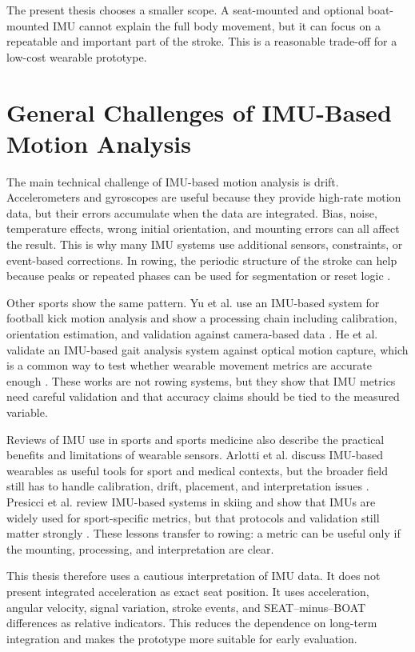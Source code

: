 The present thesis chooses a smaller scope. A seat-mounted and optional boat-mounted IMU cannot explain the full body movement, but it can focus on a repeatable and important part of the stroke. This is a reasonable trade-off for a low-cost wearable prototype.

\section{General Challenges of IMU-Based Motion Analysis}

The main technical challenge of IMU-based motion analysis is drift. Accelerometers and gyroscopes are useful because they provide high-rate motion data, but their errors accumulate when the data are integrated. Bias, noise, temperature effects, wrong initial orientation, and mounting errors can all affect the result. This is why many IMU systems use additional sensors, constraints, or event-based corrections. In rowing, the periodic structure of the stroke can help because peaks or repeated phases can be used for segmentation or reset logic \cite{cloud_adaptive_2019,rodriguez_mendoza_wearable_2024}.

Other sports show the same pattern. Yu et al. use an IMU-based system for football kick motion analysis and show a processing chain including calibration, orientation estimation, and validation against camera-based data \cite{yu_motion_2022}. He et al. validate an IMU-based gait analysis system against optical motion capture, which is a common way to test whether wearable movement metrics are accurate enough \cite{he_accuracy_2024}. These works are not rowing systems, but they show that IMU metrics need careful validation and that accuracy claims should be tied to the measured variable.

Reviews of IMU use in sports and sports medicine also describe the practical benefits and limitations of wearable sensors. Arlotti et al. discuss IMU-based wearables as useful tools for sport and medical contexts, but the broader field still has to handle calibration, drift, placement, and interpretation issues \cite{arlotti_benefits_2022}. Presicci et al. review IMU-based systems in skiing and show that IMUs are widely used for sport-specific metrics, but that protocols and validation still matter strongly \cite{presicci_imu-based_2025}. These lessons transfer to rowing: a metric can be useful only if the mounting, processing, and interpretation are clear.

This thesis therefore uses a cautious interpretation of IMU data. It does not present integrated acceleration as exact seat position. It uses acceleration, angular velocity, signal variation, stroke events, and SEAT--minus--BOAT differences as relative indicators. This reduces the dependence on long-term integration and makes the prototype more suitable for early evaluation.

